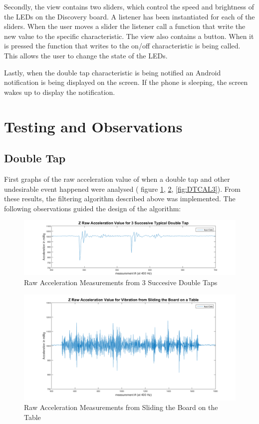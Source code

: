 \documentclass[12pt]{article}
\begin{document}
Secondly, the view contains two sliders, which control the speed and brightness of the LEDs on the Discovery board. A listener has been instantiated for each of the sliders. When the user moves a slider the listener call a function that write the new value to the specific characteristic. The view also contains a button. When it is pressed the function that writes to the on/off characteristic is being called. This allows the user to change the state of the LEDs.

Lastly, when the double tap characteristic is being notified an Android notification is being displayed on the screen. If the phone is sleeping, the screen wakes up to display the notification.


\section{Testing and Observations}
\subsection{Double Tap}
First graphs of the raw acceleration value of when a double tap and other undesirable event happened were analysed ( figure \ref{fig:DTCAL1}, \ref{fig:DTCAL2}, \ref{fig:DTCAL3}). From these results, the filtering algorithm described above was implemented. The following observations guided the design of the algorithm:

\begin{figure}[!htb]
 \centering
 \includegraphics[scale=0.45]{images/DTcalibration1.png}
 \caption{Raw Acceleration Measurements from 3 Succesive Double Taps}
 \label{fig:DTCAL1}
\end{figure}

\begin{figure}[!htb]
 \centering
 \includegraphics[scale=0.45]{images/DTcalibration2.png}
 \caption{Raw Acceleration Measurements from Sliding the Board on the Table}
 \label{fig:DTCAL2}
\end{figure}
\end{document}
